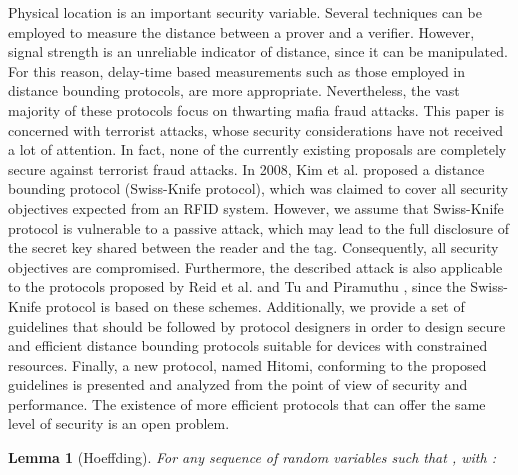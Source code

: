 \documentclass{article}
\newtheorem{lemma}{Lemma}
\begin{document}
Physical location is an important  security variable. Several techniques can be employed to measure the distance between a prover and a verifier. However, signal strength is an unreliable indicator of distance, since it can be manipulated. For this reason, delay-time based measurements such as those employed in distance bounding protocols, are more appropriate.  Nevertheless, the vast majority of these protocols focus on thwarting mafia fraud attacks. This paper is concerned with terrorist attacks, whose security considerations have not received a lot of attention. In fact, none of the currently existing proposals are completely secure against terrorist fraud attacks.  In 2008, Kim et al. \cite{KimAKSP-2008-icisc}  proposed a distance bounding protocol (Swiss-Knife protocol), which was claimed to cover all security objectives expected from an RFID system. However,  we assume that Swiss-Knife protocol is vulnerable to a passive attack, which may lead to the full disclosure of the secret key shared between the reader and the tag.  Consequently,  all security objectives are compromised. Furthermore, the described attack is also applicable to the protocols proposed by Reid et al.  \cite{reid2007} and Tu and Piramuthu \cite{TuP-2007-rfidtechnology}, since the Swiss-Knife protocol is based on these schemes.  Additionally, we provide  a set of guidelines that should be followed by protocol designers in order to design secure and efficient distance bounding protocols suitable for devices with constrained resources.  Finally, a new protocol, named Hitomi, conforming to the proposed guidelines is presented and analyzed from the point of view of security and performance.  The existence of more efficient protocols that can offer the same level of security is an open problem.

\appendix


\begin{lemma}[Hoeffding]
  For any sequence of random variables  such that
  , with  :
  
  \label{lem:hoeffding}
\end{lemma}
\end{document}
